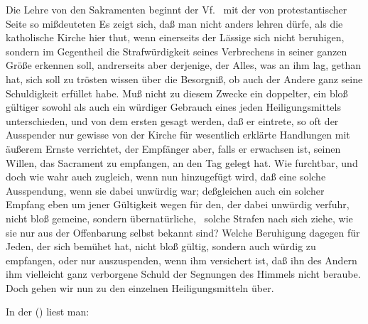 Die Lehre von den Sakramenten beginnt der Vf.\  mit der von protestantischer Seite so mißdeuteten  Es zeigt sich, daß man nicht anders lehren dürfe, als die katholische Kirche hier thut, wenn einerseits der Lässige sich nicht beruhigen, sondern im Gegentheil die Strafwürdigkeit seines Verbrechens in seiner ganzen Größe erkennen soll, andrerseits aber derjenige, der Alles, was an ihm lag, gethan hat, sich soll zu trösten wissen über die Besorgniß, ob auch der Andere ganz seine Schuldigkeit erfüllet habe. Muß nicht zu diesem Zwecke ein doppelter,  ein bloß gültiger sowohl als auch ein würdiger Gebrauch eines jeden Heiligungsmittels unterschieden, und von dem ersten gesagt werden, daß er eintrete, so oft der Ausspender nur gewisse von der Kirche für wesentlich erklärte Handlungen mit äußerem Ernste verrichtet, der Empfänger aber, falls er erwachsen ist, seinen Willen, das Sacrament zu empfangen, an den Tag gelegt hat. Wie furchtbar, und doch wie wahr auch zugleich, wenn nun hinzugefügt wird, daß eine solche Ausspendung, wenn sie dabei unwürdig war; deßgleichen auch ein solcher Empfang eben um jener Gültigkeit wegen für den, der dabei unwürdig verfuhr, nicht bloß gemeine, sondern übernatürliche, \dh\  solche Strafen nach sich ziehe, wie sie nur aus der Offenbarung selbst bekannt sind? Welche Beruhigung dagegen für Jeden, der sich bemühet hat, nicht bloß gültig, sondern auch würdig zu empfangen, oder nur auszuspenden, wenn ihm versichert ist, daß ihn des Andern ihm vielleicht ganz verborgene Schuld der Segnungen des Himmels nicht beraube. Doch gehen wir nun zu den einzelnen Heiligungsmitteln über. \par
In der  () liest man: \par
{} \usw \par
